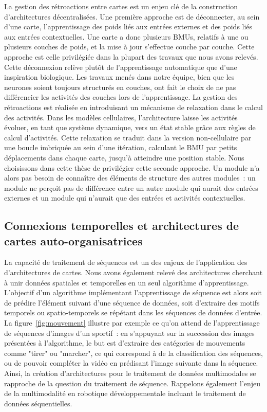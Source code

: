 \documentclass[../main]{subfiles}
\begin{document}
La gestion des rétroactions entre cartes est un enjeu clé de la construction d'architectures décentralisées. Une première approche est de déconnecter, au sein d'une carte, l'apprentissage des poids liés aux entrées externes et des poids liés aux entrées contextuelles. Une carte a donc plusieurs BMUs, relatifs à une ou plusieurs couches de poids, et la mise à jour s'effectue couche par couche. Cette approche est celle privilégiée dans la plupart des travaux que nous avons relevés. Cette déconnexion relève plutôt de l'apprentissage automatique que d'une inspiration biologique.
Les travaux menés dans notre équipe, bien que les neurones soient toujours structurés en couches, ont fait le choix de ne pas différencier les activités des couches lors de l'apprentissage. 
La gestion des rétroactions est réalisée en introduisant un mécanisme de relaxation dans le calcul des activités. Dans les modèles cellulaires, l'architecture laisse les activités évoluer, en tant que système dynamique, vers un état stable grâce aux règles de calcul d'activités.
Cette relaxation se traduit dans la version non-cellulaire par une boucle imbriquée au sein d'une itération, calculant le BMU par petits déplacements dans chaque carte, jusqu'à atteindre une position stable.
Nous choisissons dans cette thèse de privilégier cette seconde approche. Un module n'a alors pas besoin de connaître des éléments de structure des autres modules~: un module ne perçoit pas de différence entre un autre module qui aurait des entrées externes et un module qui n'aurait que des entrées et activités contextuelles.


\subsection{Connexions temporelles et architectures de cartes auto-organisatrices}

La capacité de traitement de séquences est un des enjeux de l'application des d'architectures de cartes. Nous avons également relevé des architectures cherchant à unir données spatiales et temporelles en un seul algorithme d'apprentissage. L'objectif d'un algorithme implémentant l'apprentissage de séquence est alors soit de prédire l'élément suivant d'une séquence de données, soit d'extraire des motifs temporels ou spatio-temporels se répétant dans les séquences de données d'entrée. 
La figure~\ref{fig:mouvement} illustre par exemple ce qu'on attend de l'apprentissage de séquences d'images d'un sportif~: en s'appuyant sur la succession des images présentées à l'algorithme, le but est d'extraire des catégories de mouvements comme "tirer" ou "marcher", ce qui correspond à de la classification des séquences, ou de pouvoir compléter la vidéo en prédisant l'image suivante dans la séquence.
Ainsi, la création d'architectures pour le traitement de données multimodales se rapproche de la question du traitement de séquence. Rappelons également l'enjeu de la multimodalité en robotique développementale incluant le traitement de données séquentielles.
\end{document}
